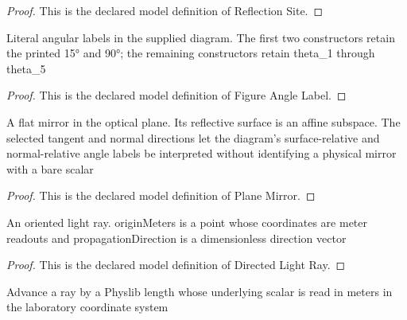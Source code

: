 \begin{proof}
  This is the declared model definition of Reflection Site.
\end{proof}
\begin{definition}
  \label{def:physics:phyx-mini-0142:phyxminiproblems-problemphyxmini0142-figureanglelabel}
  Literal angular labels in the supplied diagram. The first two constructors retain the printed 15° and 90°; the remaining constructors retain theta\_1 through theta\_5
\end{definition}
\begin{proof}
  This is the declared model definition of Figure Angle Label.
\end{proof}
\begin{definition}
  \label{def:physics:phyx-mini-0142:phyxminiproblems-problemphyxmini0142-planemirror}
  A flat mirror in the optical plane. Its reflective surface is an affine subspace. The selected tangent and normal directions let the diagram's surface-relative and normal-relative angle labels be interpreted without identifying a physical mirror with a bare scalar
\end{definition}
\begin{proof}
  This is the declared model definition of Plane Mirror.
\end{proof}
\begin{definition}
  \label{def:physics:phyx-mini-0142:phyxminiproblems-problemphyxmini0142-directedlightray}
  An oriented light ray. originMeters is a point whose coordinates are meter readouts and propagationDirection is a dimensionless direction vector
\end{definition}
\begin{proof}
  This is the declared model definition of Directed Light Ray.
\end{proof}
\begin{definition}
  \label{def:physics:phyx-mini-0142:phyxminiproblems-problemphyxmini0142-directedlightray-pointatmeters}
  Advance a ray by a Physlib length whose underlying scalar is read in meters in the laboratory coordinate system
\end{definition}
